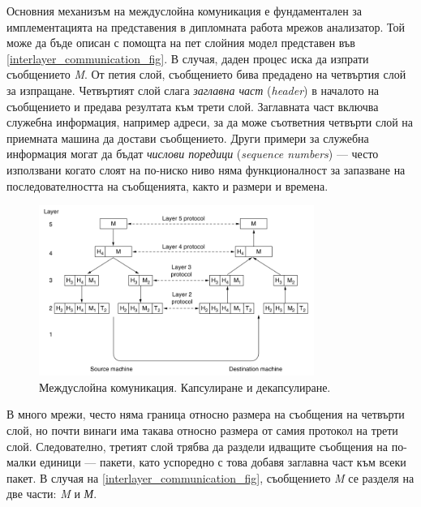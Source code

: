 \documentclass[12pt,a4paper,oneside]{book}
\begin{document}
Основния механизъм на междуслойна комуникация е фундаментален за имплементацията
на представения в дипломната работа мрежов анализатор. Той може да бъде описан
с помощта на пет слойния модел представен във
\autoref{interlayer_communication_fig}.
В случая, даден процес иска да изпрати съобщението \textit{M}. От петия
слой, съобщението бива предадено на четвъртия слой за изпращане. Четвъртият
слой слага \textit{заглавна част} (\textit{header}) в началото на съобщението и предава резултата
към трети слой. Заглавната част включва служебна информация, например адреси, за да
може съответния четвърти слой на приемната машина да достави съобщението. Други
примери за служебна информация могат да бъдат \textit{числови поредици}
(\textit{sequence numbers}) --- често използвани когато слоят на по-ниско ниво
няма функционалност за запазване на последователността на съобщенията,
както и размери и времена.

\begin{figure}[h!]
  \centering
  \includegraphics[width=0.8\textwidth]{figures/interlayer_communication.png}
  \caption{Междуслойна комуникация. Капсулиране и декапсулиране.}
  \label{interlayer_communication_fig}
\end{figure}

В много мрежи, често няма граница относно размера на съобщения на четвърти слой,
но почти винаги има такава относно размера от самия протокол на трети слой.
Следователно, третият слой трябва да раздели идващите съобщения на по-малки
единици --- пакети, като успоредно с това добавя заглавна част към всеки пакет. В
случая на \autoref{interlayer_communication_fig}, съобщението \textit{M} се
разделя на две части: \textit{M} и
\textit{М}.
\end{document}

